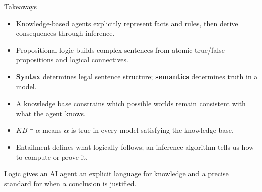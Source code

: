 \documentclass[aspectratio=169,10pt]{beamer}
\begin{document}
\begin{frame}[shrink=8]{Takeaways}
  \begin{itemize}
    \item Knowledge-based agents explicitly represent facts and rules, then derive consequences through inference.
    \item Propositional logic builds complex sentences from atomic true/false propositions and logical connectives.
    \item \textbf{Syntax} determines legal sentence structure; \textbf{semantics} determines truth in a model.
    \item A knowledge base constrains which possible worlds remain consistent with what the agent knows.
    \item \(KB\models\alpha\) means \(\alpha\) is true in every model satisfying the knowledge base.
    \item Entailment defines what logically follows; an inference algorithm tells us how to compute or prove it.
  \end{itemize}

  \begin{keyidea}
    Logic gives an AI agent an explicit language for knowledge and a precise standard for when a conclusion is justified.
  \end{keyidea}
\end{frame}
\end{document}
